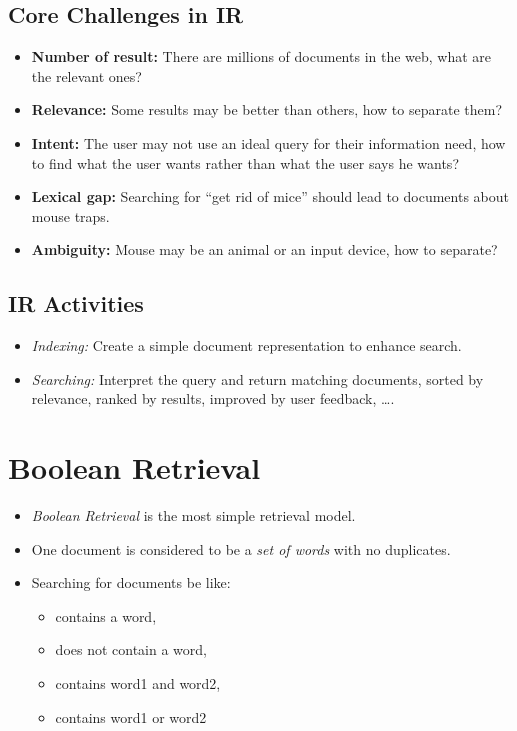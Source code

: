         \subsection{Core Challenges in IR} %
            \begin{itemize}
            	\item \textbf{Number of result:} There are millions of documents in the web, what are the relevant ones?
            	\item \textbf{Relevance:} Some results may be better than others, how to separate them?
            	\item \textbf{Intent:} The user may not use an ideal query for their information need, how to find what the user wants rather than what the user says he wants?
            	\item \textbf{Lexical gap:} Searching for \enquote{get rid of mice} should lead to documents about mouse traps.
            	\item \textbf{Ambiguity:} Mouse may be an animal or an input device, how to separate?
            \end{itemize}

        \subsection{IR Activities} %
            \begin{itemize}
            	\item \textit{Indexing:} Create a simple document representation to enhance search.
            	\item \textit{Searching:} Interpret the query and return matching documents, sorted by relevance, ranked by results, improved by user feedback, \dots.
            \end{itemize}

    \section{Boolean Retrieval} %
        \begin{itemize}
        	\item \textit{Boolean Retrieval} is the most simple retrieval model.
        	\item One document is considered to be a \textit{set of words} with no duplicates.
        	\item Searching for documents be like:
        		\begin{itemize}
        			\item contains a word,
        			\item does not contain a word,
        			\item contains word1 and word2,
        			\item contains word1 or word2
        		\end{itemize}
        \end{itemize}

